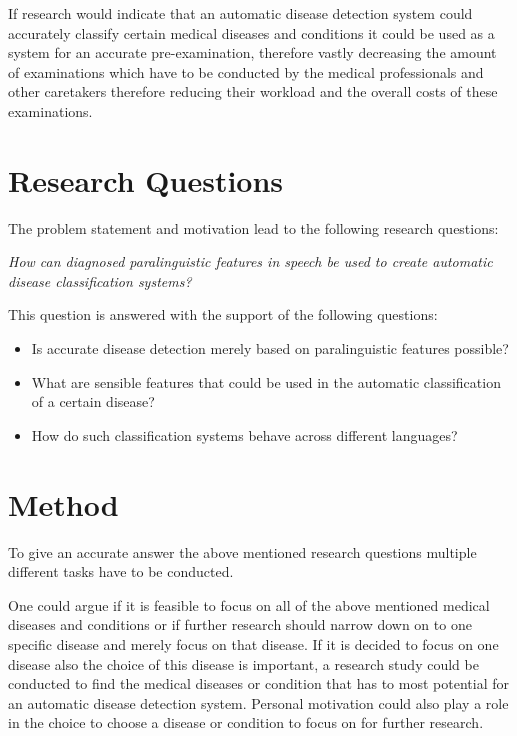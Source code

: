 \documentclass[conference]{IEEEtran}
\begin{document}
If research would indicate that an automatic disease detection system could accurately classify certain medical diseases and conditions it could be used as a system for an accurate pre-examination, therefore vastly decreasing the amount of examinations which have to be conducted by the medical professionals and other caretakers therefore reducing their workload and the overall costs of these examinations. 


\section{Research Questions} \label{questions}
The problem statement and motivation lead to the following research questions:

\textit{How can diagnosed paralinguistic features in speech be used to create automatic disease classification systems?}

This question is answered with the support of the following questions:  

\begin{itemize}
\item Is accurate disease detection merely based on paralinguistic features possible?
\item What are sensible features that could be used in the automatic classification of a certain disease?
\item How do such classification systems behave across different languages?
\end{itemize}

\section{Method} \label{method}
To give an accurate answer the above mentioned research questions multiple different tasks have to be conducted. 

One could argue if it is feasible to focus on all of the above mentioned medical diseases and conditions or if further research should narrow down on to one specific disease and merely focus on that disease. If it is decided to focus on one disease also the choice of this disease is important, a research study could be conducted to find the medical diseases or condition that has to most potential for an automatic disease detection system. Personal motivation could also play a role in the choice to choose a disease or condition to focus on for further research.
\end{document}
